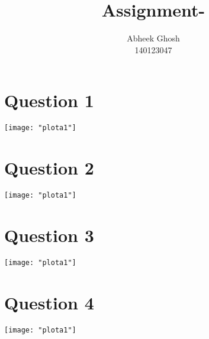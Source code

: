 \documentclass{article}
\begin{document}
	\title{\textbf{Assignment-}}
	\author{Abheek Ghosh \\ 
		140123047 }
	
	\maketitle
	

\section{Question 1}

\texttt{[image: "plota1"]}
\pagebreak


\section{Question 2}

\texttt{[image: "plota1"]}
\pagebreak

\section{Question 3}

\texttt{[image: "plota1"]}
\pagebreak

\section{Question 4}

\texttt{[image: "plota1"]}
\pagebreak
\end{document}
